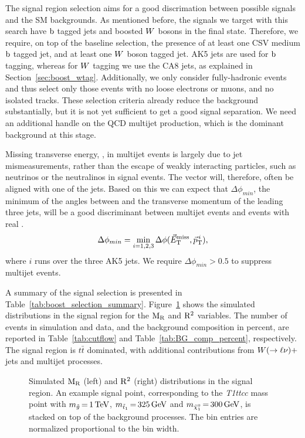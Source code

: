
The signal region selection aims for a good discrimation between possible signals and the SM
backgrounds. As mentioned before, the signals we target with this search have $\mathrm{b}$ tagged jets
and boosted $W$ bosons in the final state. Therefore, we require, on top of the baseline
selection, the presence of at least one CSV medium $\mathrm{b}$ tagged jet, and at least one $W$ boson
tagged jet. AK5 jets are used for $\mathrm{b}$ tagging, whereas for $W$ tagging we use the CA8 jets, as
explained in Section~\ref{sec:boost_wtag}. 
Additionally, we only consider fully-hadronic events and thus select only those events with no
loose electrons or muons, and no isolated tracks. 
These selection criteria already reduce the background substantially, but it is not yet sufficient
to get a good signal separation. We need an additional handle on the QCD multijet production,
which is the dominant background at this stage. 

Missing transverse energy, \ETm, in multijet events is largely due to jet mismeasurements,
rather than the escape of weakly interacting particles, such as neutrinos or the neutralinos in
signal events. The \ETm vector will, therefore, often be aligned with one of the jets. 
Based on this we can expect that $\Delta\phi_{min}$, the minimum of the angles between \VEtmiss and
the transverse momentum of the leading three jets, will be a good discriminant between multijet
events and events with real \ETm.
\begin{equation}
 \Delta\phi_{min} = \min_{i=1,2,3}{\Delta\phi({\vec E}_{\mathrm{T}}^{\text{miss}}, {\vec p}_{\mathrm{T}}^{\,i})},
\end{equation}
where $i$ runs over the three AK5 jets. We require $\Delta\phi_{min} > 0.5$ to suppress multijet
events. 

A summary of the signal selection is presented in Table~\ref{tab:boost_selection_summary}.
Figure~\ref{fig:boost_signal_dataMC} shows the simulated distributions in the signal region for the
$\mathrm{M_R}$ and $\mathrm{R^2}$ variables. The number of events in simulation and data, and the background
composition in percent, are reported in Table~\ref{tab:cutflow} and
Table~\ref{tab:BG_comp_percent}, respectively. 
The signal region is $t\bar{t}$ dominated, with additional contributions from $W(\rightarrow
\ell\nu)+$jets and multijet processes.

\begin{figure}[htbp]
\centering

\caption{Simulated $\mathrm{M_R}$ (left) and $\mathrm{R^2}$ (right) distributions in the signal region. An example
signal point, corresponding to the {\it T1ttcc} mass point with $m_{\tilde{g}}
\,{=}\, 1\,\text{Te\hspace{-.08em}V}$, $m_{\tilde{t}_1} \,{=}\, 325\,\text{Ge\hspace{-.08em}V}$ and $m_{\tilde{\chi}_1^0} \,{=}\, 300\,\text{Ge\hspace{-.08em}V}$, is
stacked on top of the background processes. The bin entries are normalized proportional to the bin
width.  
\label{fig:boost_signal_dataMC}}
\end{figure}

